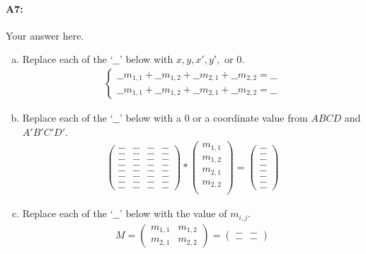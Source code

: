 \paragraph{A7:} Your answer here.

\begin{enumerate}[(a)]

\item Replace each of the `$\_\_$' below with $x, y, x', y',$ or $0$.
\begin{align}
\begin{cases}
    \_\_m_{1,1} + \_\_m_{1,2} + \_\_m_{2,1} + \_\_m_{2,2} = \_\_ \\
    \_\_m_{1,1} + \_\_m_{1,2} + \_\_m_{2,1} + \_\_m_{2,2} = \_\_
\end{cases}
\end{align}

\item Replace each of the `$\_\_$' below with a $0$ or a coordinate value from $ABCD$ and $A'B'C'D'$.
\begin{align}
    \begin{pmatrix} \_\_ & \_\_ & \_\_ & \_\_ \\ \_\_ & \_\_ & \_\_ & \_\_ \\ \_\_ & \_\_ & \_\_ & \_\_ \\ \_\_ & \_\_ & \_\_ & \_\_ \\ \_\_ & \_\_ & \_\_ & \_\_ \\ \_\_ & \_\_ & \_\_ & \_\_ \\ \_\_ & \_\_ & \_\_ & \_\_ \\ \_\_ & \_\_ & \_\_ & \_\_\end{pmatrix} *\begin{pmatrix} m_{1,1} \\ m_{1,2} \\ m_{2,1} \\ m_{2,2} \\ \end{pmatrix} = \begin{pmatrix} \_\_ \\ \_\_ \\ \_\_ \\ \_\_ \\ \_\_ \\ \_\_ \\ \_\_ \\ \_\_ \end{pmatrix}
\end{align}

\item Replace each of the `$\_\_$' below with the value of $m_{i, j}$.
\begin{align}
    M = \begin{pmatrix} m_{1,1} & m_{1,2} \\ m_{2,1} & m_{2,2} \end{pmatrix} = \begin{pmatrix} \_\_ & \_\_ \\ \_\_ & \_\_ \end{pmatrix}
\end{align}

\end{enumerate}


